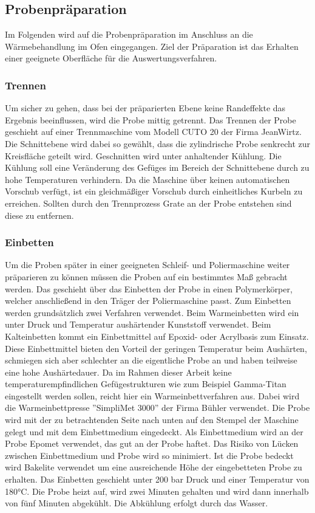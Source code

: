 \documentclass[a4paper, 11pt]{tubsreprt}
\begin{document}
\subsection{Probenpräparation}\label{Kapitel Probenpräperation}
Im Folgenden wird auf die Probenpräparation im Anschluss an die Wärmebehandlung im Ofen eingegangen. Ziel der Präparation ist das Erhalten einer geeignete Oberfläche für die Auswertungsverfahren. 

\subsubsection{Trennen}
Um sicher zu gehen, dass bei der präparierten Ebene keine Randeffekte das Ergebnis beeinflussen, wird die Probe mittig getrennt. Das Trennen der Probe geschieht auf einer Trennmaschine vom Modell CUTO 20 der Firma JeanWirtz. Die Schnittebene wird dabei so gewählt, dass die zylindrische Probe senkrecht zur Kreisfläche geteilt wird. Geschnitten wird unter anhaltender Kühlung. Die Kühlung soll eine Veränderung des Gefüges im Bereich der Schnittebene durch zu hohe Temperaturen verhindern. Da die Maschine über keinen automatischen Vorschub verfügt, ist ein gleichmäßiger Vorschub durch einheitliches Kurbeln zu erreichen. Sollten durch den Trennprozess Grate an der Probe entstehen sind diese zu entfernen.
\subsubsection{Einbetten}
Um die Proben später in einer geeigneten Schleif- und Poliermaschine weiter präparieren zu können müssen die Proben auf ein bestimmtes Maß gebracht werden. Das geschieht über das Einbetten der Probe in einen Polymerkörper, welcher anschließend in den Träger der Poliermaschine passt. Zum Einbetten werden grundsätzlich zwei Verfahren verwendet. Beim Warmeinbetten wird ein unter Druck und Temperatur aushärtender Kunststoff verwendet. Beim Kalteinbetten kommt ein Einbettmittel auf Epoxid- oder Acrylbasis zum Einsatz. Diese Einbettmittel bieten den Vorteil der geringen Temperatur beim Aushärten, schmiegen sich aber schlechter an die eigentliche Probe an und haben teilweise eine hohe Aushärtedauer. Da im Rahmen dieser Arbeit keine temperaturempfindlichen Gefügestrukturen wie zum Beispiel Gamma-Titan eingestellt werden sollen, reicht hier ein Warmeinbettverfahren aus. Dabei wird die  Warmeinbettpresse ''SimpliMet 3000'' der Firma Bühler verwendet. Die Probe wird mit der zu betrachtenden Seite nach unten auf den Stempel der Maschine gelegt und mit dem Einbettmedium eingedeckt. Als Einbettmedium wird an der Probe Epomet verwendet, das gut an der Probe haftet. Das Risiko von Lücken zwischen Einbettmedium und Probe wird so minimiert. Ist die Probe bedeckt wird Bakelite verwendet um eine ausreichende Höhe der eingebetteten Probe zu erhalten. Das Einbetten geschieht unter 200 bar Druck und einer Temperatur von 180°C. Die Probe heizt auf, wird zwei Minuten gehalten und wird dann innerhalb von fünf Minuten abgekühlt. Die Abkühlung erfolgt durch das Wasser. 
\end{document}

